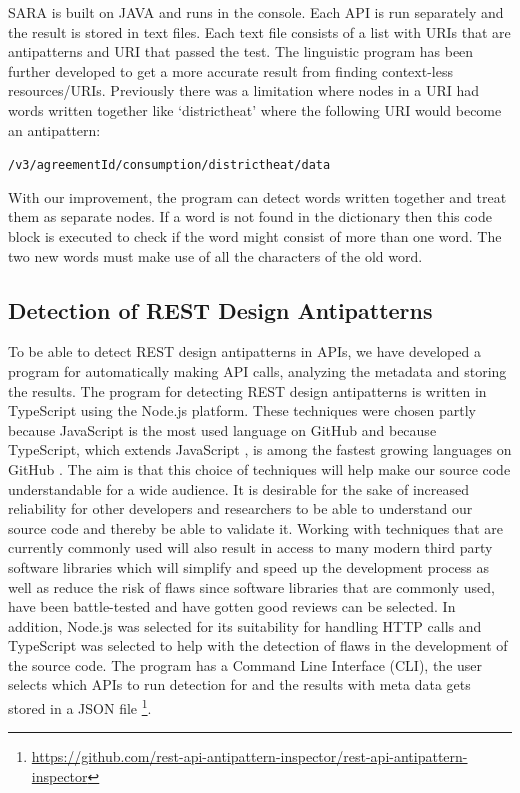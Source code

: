 SARA is built on JAVA and runs in the console. Each API is run separately and the result is stored in text files. Each text file consists of a list with URIs that are antipatterns and URI that passed the test.
The linguistic program has been further developed to get a more accurate result from finding context-less resources/URIs. Previously there was a limitation where nodes in a URI had words written together like `districtheat' where the following URI would become an antipattern: 

\vspace{2mm}
\texttt{/v3/{agreementId}/consumption/districtheat/data}

\vspace{2mm}
With our improvement, the program can detect words written together and treat them as separate nodes. If a word is not found in the dictionary then this code block is executed to check if the word might consist of more than one word. The two new words must make use of all the characters of the old word.

\subsection{Detection of REST Design Antipatterns}

To be able to detect REST design antipatterns in APIs, we have developed a program for automatically making API calls, analyzing the metadata and storing the results. 
The program for detecting REST design antipatterns is written in TypeScript using the Node.js platform. These techniques were chosen partly because JavaScript is the most used language on GitHub \cite{octogithub} and because TypeScript, which extends JavaScript \cite{typescript}, is among the fastest growing languages on GitHub \cite{octogithub}. The aim is that this choice of techniques will help make our source code understandable for a wide audience. It is desirable for the sake of increased reliability for other developers and researchers to be able to understand our source code and thereby be able to validate it. Working with techniques that are currently commonly used will also result in access to many modern third party software libraries which will simplify and speed up the development process as well as reduce the risk of flaws since software libraries that are commonly used, have been battle-tested and have gotten good reviews can be selected. In addition, Node.js was selected for its suitability for handling HTTP calls \cite{nodejs} and TypeScript was selected to help with the detection of flaws \cite{typescript} in the development of the source code. 
The program has a Command Line Interface (CLI), the user selects which APIs to run detection for and the results with meta data gets stored in a JSON file \footnote{\url{https://github.com/rest-api-antipattern-inspector/rest-api-antipattern-inspector}}. 

